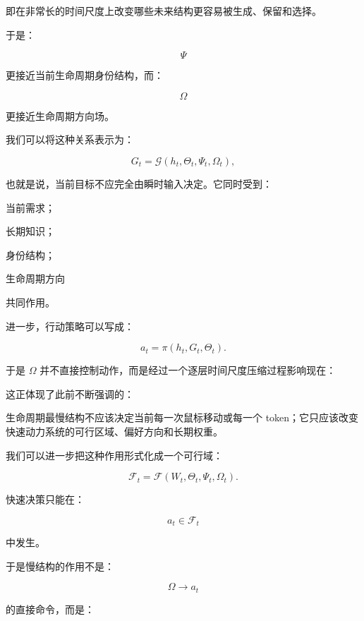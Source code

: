 即在非常长的时间尺度上改变哪些未来结构更容易被生成、保留和选择。

于是：

\[
\Psi
\]

更接近当前生命周期身份结构，而：

\[
\Omega
\]

更接近生命周期方向场。

我们可以将这种关系表示为：

\[
G_t
=
\mathcal{G}
\left(
h_t,
\Theta_t,
\Psi_t,
\Omega_t
\right),
\]

也就是说，当前目标不应完全由瞬时输入决定。它同时受到：

当前需求；

长期知识；

身份结构；

生命周期方向

共同作用。

进一步，行动策略可以写成：

\[
a_t
=
\pi
\left(
h_t,
G_t,
\Theta_t
\right).
\]

于是 $\Omega$ 并不直接控制动作，而是经过一个逐层时间尺度压缩过程影响现在：

\begin{statementbox}
\centering
{}
\end{statementbox}

这正体现了此前不断强调的：

\begin{statementbox}
\centering
{}
\end{statementbox}

生命周期最慢结构不应该决定当前每一次鼠标移动或每一个 token；它只应该改变快速动力系统的可行区域、偏好方向和长期权重。

我们可以进一步把这种作用形式化成一个可行域：

\[
\mathcal{F}_t
=
\mathcal{F}
\left(
W_t,
\Theta_t,
\Psi_t,
\Omega_t
\right).
\]

快速决策只能在：

\[
a_t\in\mathcal{F}_t
\]

中发生。

于是慢结构的作用不是：

\[
\Omega\to a_t
\]

的直接命令，而是：

\begin{statementbox}
\centering
{}
\end{statementbox}

